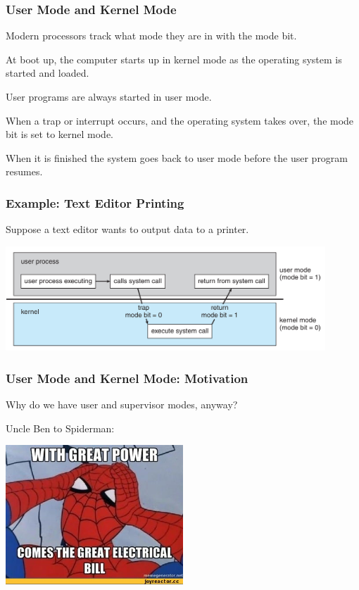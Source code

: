 \begin{frame}
\frametitle{User Mode and Kernel Mode}

Modern processors track what mode they are in with the mode bit. 

At boot up, the computer starts up in kernel mode as the operating system is started and loaded. 

User programs are always started in user mode. 

When a trap or interrupt occurs, and the operating system takes over, the mode bit is set to kernel mode. 

When it is finished the system goes back to user mode before the user program resumes.


\end{frame}


\begin{frame}
\frametitle{Example: Text Editor Printing}

Suppose a text editor wants to output data to a printer.

\begin{center}
	\includegraphics[width=0.9\textwidth]{images/trap.png}
\end{center}

\end{frame}

\begin{frame}
\frametitle{User Mode and Kernel Mode: Motivation}

Why do we have user and supervisor modes, anyway? 

Uncle Ben to Spiderman: 
\begin{center}
	\includegraphics[width=0.5\textwidth]{images/spiderman.jpg}
\end{center}

\end{frame}

